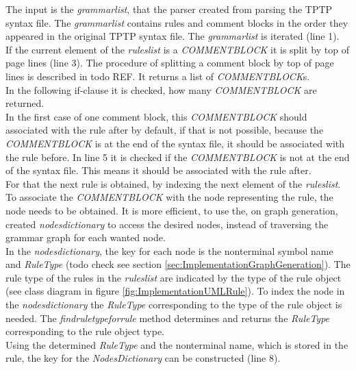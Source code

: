 The input is the \textit{grammar\textunderscore list}, that the parser created from parsing the \ac{TPTP} syntax file.
The \textit{grammar\textunderscore list} contains rules and comment blocks in the order they appeared in the original \ac{TPTP} syntax file.
The \textit{grammar\textunderscore list} is iterated (line 1).\\
If the current element of the \textit{rules\textunderscore list} is a \textit{COMMENT\textunderscore BLOCK} it is split by top of page lines (line 3).
The procedure of splitting a comment block by top of page lines is described in todo REF.
It returns a list of \textit{COMMENT\textunderscore BLOCK}s.\\
In the following if-clause it is checked, how many \textit{COMMENT\textunderscore BLOCK} are returned.\\
In the first case of one comment block, this \textit{COMMENT\textunderscore BLOCK} should associated with the rule after by default, if that is not possible, because the \textit{COMMENT\textunderscore BLOCK} is at the end of the syntax file, it should be associated with the rule before.
In line 5 it is checked if the \textit{COMMENT\textunderscore BLOCK} is not at the end of the syntax file. This means it should be associated with the rule after.\\
For that the next rule is obtained, by indexing the next element of the \textit{rules\textunderscore list}.
To associate the \textit{COMMENT\textunderscore BLOCK} with the node representing the rule, the node needs to be obtained.
It is more efficient, to use the, on graph generation, created \textit{nodes\textunderscore dictionary} to access the desired nodes, instead of traversing the grammar graph for each wanted node.\\
In the \textit{nodes\textunderscore dictionary}, the key for each node is the nonterminal symbol name and \textit{RuleType} (todo check see section \ref{sec:ImplementationGraphGeneration}).
The rule type of the rules in the \textit{rules\textunderscore list} are indicated by the type of the rule object (see class diagram in figure \ref{fig:ImplementationUMLRule}).
To index the node in the \textit{nodes\textunderscore dictionary} the \textit{RuleType} corresponding to the type of the rule object is needed.
The \textit{find\textunderscore rule\textunderscore type\textunderscore for\textunderscore rule} method determines and returns the \textit{RuleType} corresponding to the rule object type.\\
Using the determined \textit{RuleType} and the nonterminal name, which is stored in the rule, the key for the \textit{Nodes\textunderscore Dictionary} can be constructed (line 8).
